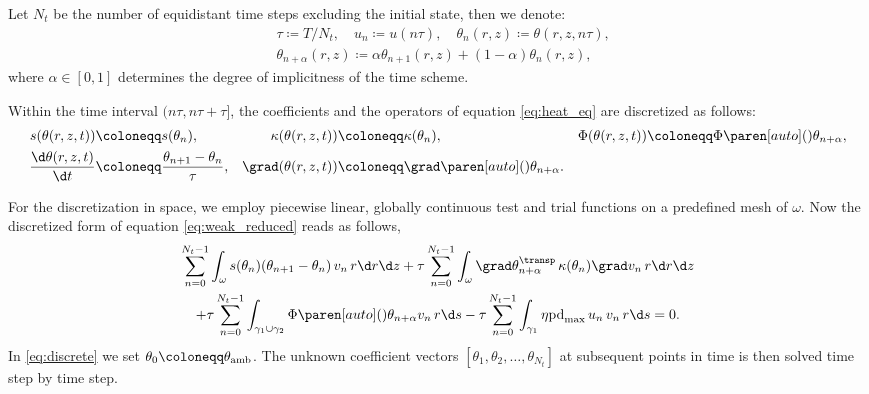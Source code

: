 Let $N_t$ be the number of equidistant time steps excluding the initial state, then we denote:
\begin{equation}
	\begin{aligned}
		&
		\tau 
		\coloneqq 
		T/N_t
		, 
		\quad
		u_n 
		\coloneqq 
		u(n\tau)
		,
		\quad
		\theta_n(r,z) 
		\coloneqq 
		\theta(r,z,n\tau)
		, 
		\\
		&
		\theta_{n+\alpha}(r,z) 
		\coloneqq 
		\alpha\theta_{n+1}(r,z) + (1-\alpha)\theta_n(r,z)
		,
	\end{aligned}
\end{equation}
where $\alpha \in [0,1]$ determines the degree of implicitness of the time scheme.

Within the time interval $(n\tau, n\tau+\tau]$, the coefficients and the operators of equation \eqref{eq:heat_eq} are discretized as follows:
\begin{equation}
	\begin{aligned}
		s(\theta(r,z,t)) 
		&
		\coloneqq 
		s(\theta_n)
		, 
		&
		\kappa(\theta(r,z,t)) 
		&
		\coloneqq 
		\kappa(\theta_n)
		, 
		&
		\Phi(\theta(r,z,t)) 
		&
		\coloneqq 
		\Phi \paren[auto](){\theta_{n+\alpha}}
		, 
		\\
		\frac{\d\theta(r,z,t)}{\d t} 
		&
		\coloneqq 
		\frac{\theta_{n+1}-\theta_n}{\tau}
		, 
		&
		\grad(\theta(r,z,t)) 
		&
		\coloneqq 
		\grad \paren[auto](){\theta_{n+\alpha}}
		.
	\end{aligned}
\end{equation}

For the discretization in space, we employ piecewise linear, globally continuous test and trial functions on a predefined mesh of $\omega$.
Now the discretized form of equation \eqref{eq:weak_reduced} reads as follows,
\begin{multline} \label{eq:discrete}
	\sum_{n=0}^{N_t-1} \int_{\omega}
	s(\theta_n) (\theta_{n+1}-\theta_n) \, v_n \, r \d r \d z
	+ \tau \sum_{n=0}^{N_t-1} \int_{\omega}
	\grad \theta_{n+\alpha}^\transp \, \kappa(\theta_n) \grad v_n \, r \d r \d z 
	\\
	+ \tau \sum_{n=0}^{N_t-1} \int_{\gamma_1 \cup \gamma_2}
	\Phi \paren[auto](){\theta_{n+\alpha}} v_n \, r \d s
	- \tau \sum_{n=0}^{N_t-1} \int_{\gamma_1}
	\eta \text{pd}_{\max} \, u_n \, v_n \, r \d s 
	= 
	0
	.
\end{multline}
In \eqref{eq:discrete} we set $\theta_0 \coloneqq \theta_\textup{amb}$.
The unknown coefficient vectors $[\theta_1, \theta_2, \ldots, \theta_{N_t}]$ at subsequent points in time is then solved time step by time step.


